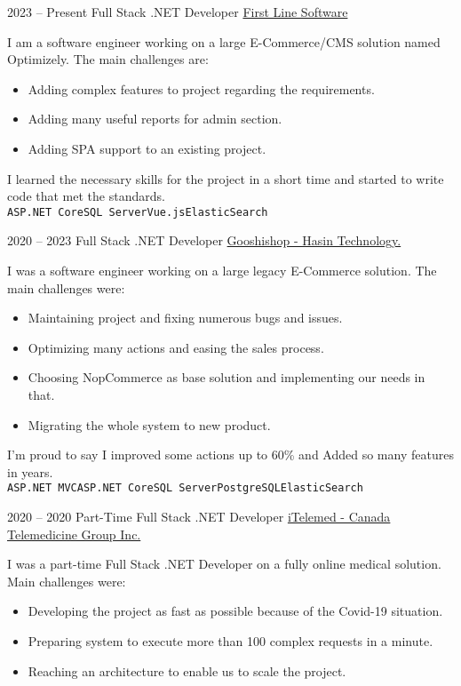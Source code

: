 \documentclass[a4paper]{developercv} %
\begin{document}
\begin{entrylist}
	\entry
	{2023 -- Present}
	{Full Stack .NET Developer}
	{\href{https://firstlinesoftware.com/}{First Line Software}}
	{I am a software engineer working on a large E-Commerce/CMS solution named Optimizely. The main challenges are:
	\begin{itemize}[noitemsep]
		\item Adding complex features to project regarding the requirements.
		\item Adding many useful reports for admin section.
		\item Adding SPA support to an existing project.
	\end{itemize}
	I learned the necessary skills for the project in a short time and started to write code that met the standards.
		\\\texttt{ASP.NET Core}\slashsep\texttt{SQL Server}\slashsep\texttt{Vue.js}\slashsep\texttt{ElasticSearch}}
	\entry
	{2020 -- 2023}
	{Full Stack .NET Developer}
	{\href{https://gooshishop.com}{Gooshishop - Hasin Technology.}}
	{I was a software engineer working on a large legacy E-Commerce solution. The main challenges were:
	\begin{itemize}[noitemsep]
		\item Maintaining project and fixing numerous bugs and issues.
		\item Optimizing many actions and easing the sales process.
		\item Choosing NopCommerce as base solution and implementing our needs in that.
		\item Migrating the whole system to new product.
	\end{itemize}
	I'm proud to say I improved some actions up to 60\% and Added so many features in years.
		\\\texttt{ASP.NET MVC}\slashsep\texttt{ASP.NET Core}\slashsep\texttt{SQL Server}\slashsep\texttt{PostgreSQL}\slashsep\texttt{ElasticSearch}}
	\entry
	{2020 -- 2020}
	{Part-Time Full Stack .NET Developer}
	{\href{https://itelemed.ca}{iTelemed - Canada Telemedicine Group Inc.}}
	{I was a part-time Full Stack .NET Developer on a fully online medical solution. Main challenges were:
	\begin{itemize}[noitemsep]
		\item Developing the project as fast as possible because of the Covid-19 situation.
		\item Preparing system to execute more than 100 complex requests in a minute.
		\item Reaching an architecture to enable us to scale the project.

\end{itemize}}
\end{entrylist}
\end{document}
